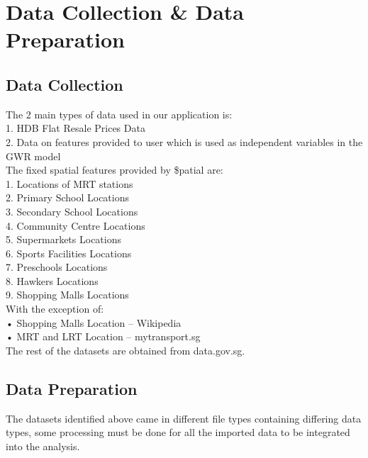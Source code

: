 \documentclass{acm_proc_article-sp}
\begin{document}
\hypertarget{data-collection-data-preparation}{%
\section{Data Collection \& Data
Preparation}\label{data-collection-data-preparation}}

\hypertarget{data-collection}{%
\subsection{Data Collection}\label{data-collection}}

The 2 main types of data used in our application is:\\
1. HDB Flat Resale Prices Data\\
2. Data on features provided to user which is used as independent
variables in the GWR model\\

The fixed spatial features provided by \$patial are:\\
1. Locations of MRT stations\\
2. Primary School Locations\\
3. Secondary School Locations\\
4. Community Centre Locations\\
5. Supermarkets Locations\\
6. Sports Facilities Locations\\
7. Preschools Locations\\
8. Hawkers Locations\\
9. Shopping Malls Locations\\

With the exception of:\\
• Shopping Malls Location -- Wikipedia\\
• MRT and LRT Location -- mytransport.sg\\
The rest of the datasets are obtained from data.gov.sg.

\hypertarget{data-preparation}{%
\subsection{Data Preparation}\label{data-preparation}}

The datasets identified above came in different file types containing
differing data types, some processing must be done for all the imported
data to be integrated into the analysis.
\end{document}
